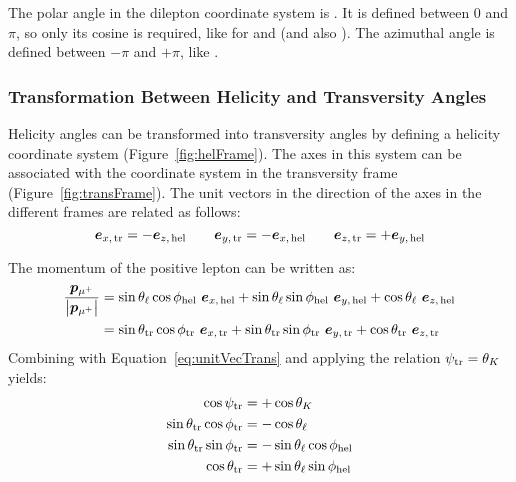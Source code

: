 The polar angle in the dilepton coordinate system is \thetatr. It is defined between 0 and $\pi$,
so only its cosine is required, like for \thetak{} and \thetal{} (and also \psitr). The azimuthal
angle \phitr{} is defined between $-\pi$ and $+\pi$, like \phihel.

\subsubsection{Transformation Between Helicity and Transversity Angles}
Helicity angles can be transformed into transversity angles by defining a helicity coordinate
system (Figure~\ref{fig:helFrame}). The axes in this system can be associated with the coordinate
system in the transversity frame (Figure~\ref{fig:transFrame}). The unit vectors in the direction
of the axes in the different frames are related as follows:
\begin{equation}
  \label{eq:unitVecTrans}
  \vec{e}_{x\text{,\,tr}} = -\vec{e}_{z\text{,\,hel}} \qquad
  \vec{e}_{y\text{,\,tr}} = -\vec{e}_{x\text{,\,hel}} \qquad
  \vec{e}_{z\text{,\,tr}} = +\vec{e}_{y\text{,\,hel}}
\end{equation}

The momentum of the positive lepton can be written as:
\begin{align}
  \frac{\bm{p}_{\mu^+}}{\left|\bm{p}_{\mu^+}\right|}
    &= \sin\theta_\ell\cos\phi_\text{hel}\ \bm{e}_{x\text{,\,hel}}
     + \sin\theta_\ell\sin\phi_\text{hel}\ \bm{e}_{y\text{,\,hel}}
     + \cos\theta_\ell\ \bm{e}_{z\text{,\,hel}} \\
    &= \sin\theta_\text{tr}\cos\phi_\text{tr}\ \bm{e}_{x\text{,\,tr}}
     + \sin\theta_\text{tr}\sin\phi_\text{tr}\ \bm{e}_{y\text{,\,tr}}
     + \cos\theta_\text{tr}\ \bm{e}_{z\text{,\,tr}}
\end{align}
Combining with Equation~\ref{eq:unitVecTrans} and applying the relation $\psi_\text{tr}=\theta_K$ yields:
\begin{equation}
  \label{eq:angleTrans}
  \begin{split}
    \cos\psitr              &= +\cos\thetak             \\
    \sin\thetatr\cos\phitr  &= -\cos\thetal             \\
    \sin\thetatr\sin\phitr  &= -\sin\thetal\cos\phihel  \\
    \cos\thetatr            &= +\sin\thetal\sin\phihel
  \end{split}
\end{equation}


